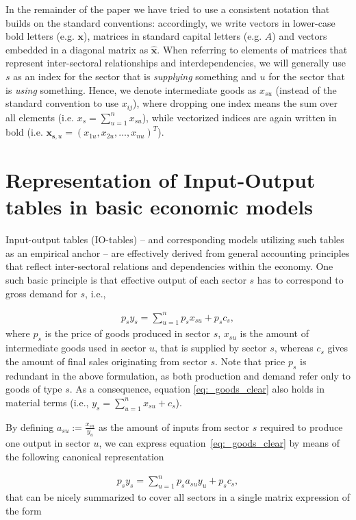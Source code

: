 \documentclass{article}
\begin{document}
In the remainder of the paper we have tried to use a consistent notation that builds on the standard conventions: accordingly, we write vectors in lower-case bold letters (e.g. $\mathbf{x}$), matrices in standard capital letters (e.g. $A$) and vectors embedded in a diagonal matrix as $\hat{\mathbf{x}}$. When referring to elements of matrices that represent inter-sectoral relationships and interdependencies, we will generally use $s$ as an index for the sector that is \textit{supplying} something and $u$ for the sector that is \textit{using} something. Hence, we denote intermediate goods as $x_{su}$ (instead of the standard convention to use $x_{ij}$), where dropping one index means the sum over all elements (i.e. $x_s=\sum_{u=1}^n x_{su}$), while vectorized indices are again written in bold (i.e. $\mathbf{x}_{\mathbf{s},u}=(x_{1u},x_{2u}, \dots , x_{nu})^T$).

\section{Representation of Input-Output tables in basic economic models} \label{sec:IO_models}

Input-output tables (IO-tables) -- and corresponding models utilizing such tables as an empirical anchor -- are effectively derived from general accounting principles that reflect inter-sectoral relations and dependencies within the economy. One such basic principle is that effective output of each sector $s$ has to correspond to gross demand for $s$, i.e.,

\begin{align}
  \label{eq:_goods_clear}
  p_sy_s = \sum_{u = 1}^n p_s x_{su} + p_s c_s,
\end{align}
where $p_s$ is the price of goods produced in sector $s$, $x_{su}$ is the amount of intermediate goods used in sector $u$, that is supplied by sector $s$, whereas $c_s$ gives the amount of final sales originating from sector $s$. Note that price $p_s$ is redundant in the above formulation, as both production and demand refer only to goods of type $s$. As a consequence, equation \eqref{eq:_goods_clear} also holds in material terms (i.e., $y_s = \sum_{u = 1}^n x_{su} + c_s$).

By defining $a_{su} := \frac{x_{su}}{y_u}$ as  the amount of inputs from sector $s$ required to produce one output in sector $u$, we can express equation~\eqref{eq:_goods_clear} by means of the following canonical representation

\begin{align}
  \label{eq:_goods_clear_a}
  p_s y_s = \sum_{u = 1}^n p_s a_{su} y_u + p_s c_s,
\end{align}
that can be nicely summarized to cover all sectors in a single matrix expression of the form
\end{document}
